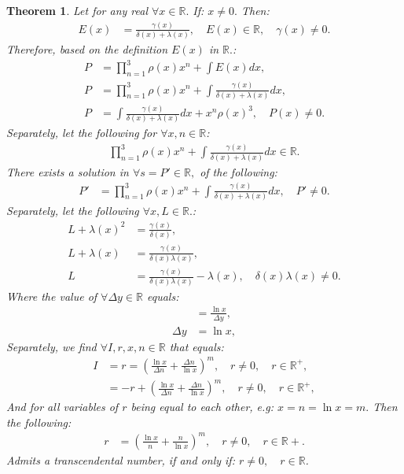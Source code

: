 \documentclass[10pt]{article}
\theoremstyle{plain}
\newtheorem{theorem}{Theorem}[section]
\theoremstyle{definition}
\theoremstyle{remark}
\begin{document}
\begin{theorem}
	Let for any real $\forall x \in \mathbb{R}.$ If: $x \neq 0.$ Then:
	\begin{align*}
		E(x) &= \frac{\gamma(x)}{\delta(x) + \lambda(x)}, \quad E(x) \in \mathbb{R}, \quad \gamma(x) \neq 0.
	\end{align*}
	Therefore, based on the definition $E(x)$ in $\mathbb{R}.$:
	\begin{align*}
		P &= \prod_{n=1}^{3}\rho(x) x^{n} + \int E(x) dx,\\
		P &= \prod_{n=1}^{3}\rho(x) x^{n} + \int \frac{\gamma(x)}{\delta(x) + \lambda(x)} dx,\\
		P &= \int \frac{\gamma(x)}{\delta(x) + \lambda(x)} dx + x^{n} \rho(x)^{3}, \quad P(x) \neq 0.
	\end{align*}
	Separately, let the following for $\forall x, n \in \mathbb{R}$:
	\begin{align*}
		\prod_{n=1}^{3}\rho(x) x^{n} + \int \frac{\gamma(x)}{\delta(x) + \lambda(x)} dx \in \mathbb{R}.
	\end{align*}
	There exists a solution in $\forall s = P' \in \mathbb{R},$ of the following:
	\begin{align*}
		P' &= \prod_{n=1}^{3}\rho(x) x^{n} + \int \frac{\gamma(x)}{\delta(x) + \lambda(x)} dx, \quad P' \neq 0.
	\end{align*}
	Separately, let the following $\forall x, L \in \mathbb{R}.$:
	\begin{align*}
		L + \lambda(x)^{2} &= \frac{\gamma(x)}{\delta(x)},\\
	 	L + \lambda(x) &= \frac{\gamma(x)}{\delta(x)  \lambda(x) },\\
	 	L &= \frac{\gamma(x)}{\delta(x)  \lambda(x) } - \lambda(x), \quad \delta(x)\lambda(x) \neq 0.
	\end{align*}
	Where the value of $\forall \Delta y \in \mathbb{R}$ equals:
	\begin{align*}
		&= \frac{\ln x}{\Delta y},\\
		\Delta y &= \ln x,
	\end{align*}
	Separately, we find $\forall I, r, x, n \in \mathbb{R}$ that equals:
	\begin{align*}
		I &= r = ( \frac{\ln x}{\Delta n} + \frac{\Delta n}{\ln x})^m, \quad r \neq 0, \quad r \in \mathbb{R}^{+},\\
		&= - r + ( \frac{\ln x}{\Delta n} + \frac{\Delta n}{\ln x})^m, \quad r \neq 0, \quad r \in \mathbb{R}^{+},
	\end{align*}
	And for all variables of $r$ being equal to each other, e.g: $x =n = \ln x = m.$ Then the following:
	\begin{align*}
		r &= ( \frac{\ln x}{n} + \frac{n}{\ln x})^m, \quad r \neq 0, \quad r \in \mathbb{R}{+}.
	\end{align*}
	Admits a transcendental number, if and only if: $r \neq 0, \quad r \in \mathbb{R}$.
\end{theorem}
\end{document}
